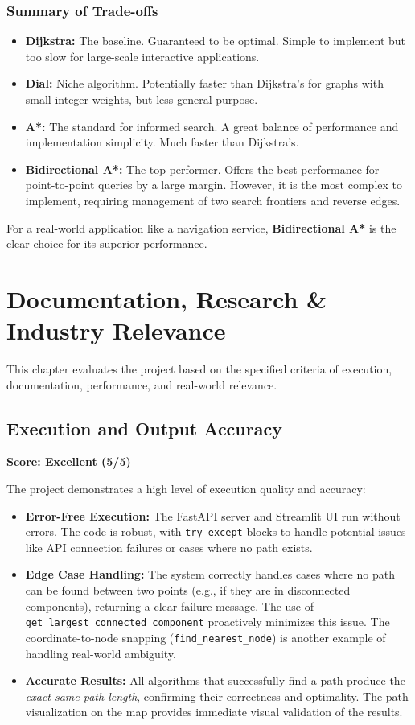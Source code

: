 \documentclass[12pt, a4paper]{report}
\begin{document}
\subsection{Summary of Trade-offs}
\begin{itemize}
    \item \textbf{Dijkstra:} The baseline. Guaranteed to be optimal. Simple to implement but too slow for large-scale interactive applications.
    \item \textbf{Dial:} Niche algorithm. Potentially faster than Dijkstra's for graphs with small integer weights, but less general-purpose.
    \item \textbf{A*:} The standard for informed search. A great balance of performance and implementation simplicity. Much faster than Dijkstra's.
    \item \textbf{Bidirectional A*:} The top performer. Offers the best performance for point-to-point queries by a large margin. However, it is the most complex to implement, requiring management of two search frontiers and reverse edges.
\end{itemize}
For a real-world application like a navigation service, \textbf{Bidirectional A*} is the clear choice for its superior performance.

\clearpage
\chapter{Documentation, Research \& Industry Relevance}

This chapter evaluates the project based on the specified criteria of execution, documentation, performance, and real-world relevance.

\section{Execution and Output Accuracy}
\textbf{Score: Excellent (5/5)}

The project demonstrates a high level of execution quality and accuracy:
\begin{itemize}
    \item \textbf{Error-Free Execution:} The FastAPI server and Streamlit UI run without errors. The code is robust, with \texttt{try-except} blocks to handle potential issues like API connection failures or cases where no path exists.
    \item \textbf{Edge Case Handling:} The system correctly handles cases where no path can be found between two points (e.g., if they are in disconnected components), returning a clear failure message. The use of \texttt{get\_largest\_connected\_component} proactively minimizes this issue. The coordinate-to-node snapping (\texttt{find\_nearest\_node}) is another example of handling real-world ambiguity.
    \item \textbf{Accurate Results:} All algorithms that successfully find a path produce the \textit{exact same path length}, confirming their correctness and optimality. The path visualization on the map provides immediate visual validation of the results.
\end{itemize}
\end{document}
